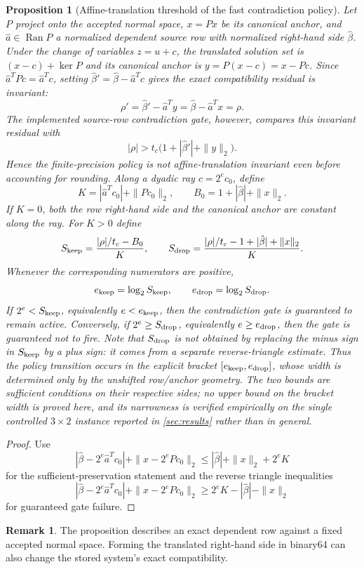 \documentclass[11pt]{article}
\newtheorem{proposition}[theorem]{Proposition}
\theoremstyle{definition}
\newtheorem{remark}[theorem]{Remark}
\begin{document}
\begin{proposition}[Affine-translation threshold of the fast contradiction policy]\label{prop:translation-threshold}
Let $P$ project onto the accepted normal space, $x=Px$ be its canonical anchor, and $\hat a\in\operatorname{Ran}P$ a normalized dependent source row with normalized right-hand side $\hat\beta$. Under the change of variables $z=u+c$, the translated solution set is $(x-c)+\ker P$ and its canonical anchor is $y=P(x-c)=x-Pc$. Since $\hat a^TPc=\hat a^Tc$, setting $\hat\beta'=\hat\beta-\hat a^Tc$ gives
the exact compatibility residual is invariant:
\[
 \rho'=\hat\beta'-\hat a^Ty=\hat\beta-\hat a^Tx=\rho.
\]
The implemented source-row contradiction gate, however, compares this invariant residual with
\[
 |\rho|>t_c\bigl(1+|\hat\beta'|+\|y\|_2\bigr).
\]
Hence the finite-precision policy is not affine-translation invariant even before accounting for rounding.  Along a dyadic ray $c=2^e c_0$, define
\[
 K=|\hat a^Tc_0|+\|Pc_0\|_2,\qquad B_0=1+|\hat\beta|+\|x\|_2.
\]
If $K=0$, both the row right-hand side and the canonical anchor are constant along the ray. For $K>0$ define
\[
 S_{\rm keep}=\frac{|\rho|/t_c-B_0}{K},
 \qquad
 S_{\rm drop}=\frac{|\rho|/t_c-1+|\hat\beta|+\|x\|_2}{K}.
\]
Whenever the corresponding numerators are positive,
\[
 e_{\rm keep}=\log_2 S_{\rm keep},
 \qquad
 e_{\rm drop}=\log_2 S_{\rm drop}.
\]
If $2^e<S_{\rm keep}$, equivalently $e<e_{\rm keep}$, then the contradiction gate is guaranteed to remain active.  Conversely, if $2^e\ge S_{\rm drop}$, equivalently $e\ge e_{\rm drop}$, then the gate is guaranteed not to fire.  Note that $S_{\rm drop}$ is \emph{not} obtained by replacing the minus sign in $S_{\rm keep}$ by a plus sign: it comes from a separate reverse-triangle estimate.  Thus the policy transition occurs in the explicit bracket $[e_{\rm keep},e_{\rm drop}]$, whose width is determined only by the unshifted row/anchor geometry. The two bounds are sufficient conditions on their respective sides; no upper bound on the bracket width is proved here, and its narrowness is verified empirically on the single controlled $3\times2$ instance reported in \cref{sec:results} rather than in general.
\end{proposition}
\begin{proof}
Use
\[
 |\hat\beta-2^e\hat a^Tc_0|+\|x-2^ePc_0\|_2
 \le |\hat\beta|+\|x\|_2+2^eK
\]
for the sufficient-preservation statement and the reverse triangle inequalities
\[
 |\hat\beta-2^e\hat a^Tc_0|+\|x-2^ePc_0\|_2
 \ge 2^eK-|\hat\beta|-\|x\|_2
\]
for guaranteed gate failure.
\end{proof}
\begin{remark}
The proposition describes an exact dependent row against a fixed accepted normal space. Forming the translated right-hand side in binary64 can also change the stored system's exact compatibility.
\end{remark}
\end{document}

